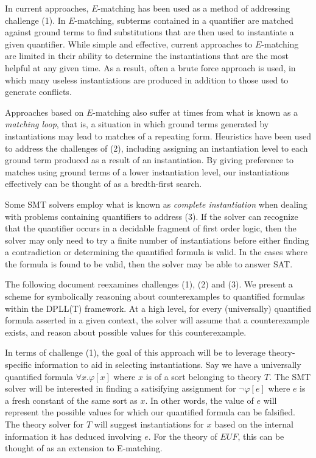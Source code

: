 \documentclass{llncs}
\begin{document}
In current approaches, $E$-matching has been used as a method of addressing challenge (1).
In $E$-matching, subterms contained in a quantifier are matched against ground terms to find substitutions that are then used to instantiate a given quantifier.
While simple and effective, current approaches to $E$-matching are limited in their ability to determine the instantiations that are the most helpful at any given time.
As a result, often a brute force approach is used, in which many useless instantiations are produced in addition to those used to generate conflicts.

Approaches based on $E$-matching also suffer at times from what is known as a \emph{matching loop}, that is, a situation in which ground terms generated by instantiations may lead to matches of a repeating form.
Heuristics have been used to address the challenges of (2), including assigning an instantiation level to each ground term produced as a result of an instantiation.
By giving preference to matches using ground terms of a lower instantiation level, our instantiations effectively can be thought of as a bredth-first search.

Some SMT solvers employ what is known as \emph{complete instantiation} when dealing with problems containing quantifiers to address (3).
If the solver can recognize that the quantifier occurs in a decidable fragment of first order logic, then the solver may only need to try a finite number of instantiations before either finding a contradiction or determining the quantified formula is valid.
In the cases where the formula is found to be valid, then the solver may be able to answer SAT.

The following document reexamines challenges (1), (2) and (3).
We present a scheme for symbolically reasoning about counterexamples to quantified formulas within the DPLL(T) framework.
At a high level, for every (universally) quantified formula asserted in a given context, the solver will assume that a counterexample exists, and reason about possible values for this counterexample.

In terms of challenge (1), the goal of this approach will be to leverage theory-specific information to aid in selecting instantiations.
Say we have a universally quantified formula $\forall x. \varphi[x]$ where $x$ is of a sort belonging to theory $T$.
The SMT solver will be interested in finding a satisifying assignment for $ \neg \varphi[e]$ where $e$ is a fresh constant of the same sort as $x$.
In other words, the value of $e$ will represent the possible values for which our quantified formula can be falsified.
The theory solver for $T$ will suggest instantiations for $x$ based on the internal information it has deduced involving $e$.
For the theory of $EUF$, this can be thought of as an extension to E-matching.
\end{document}
